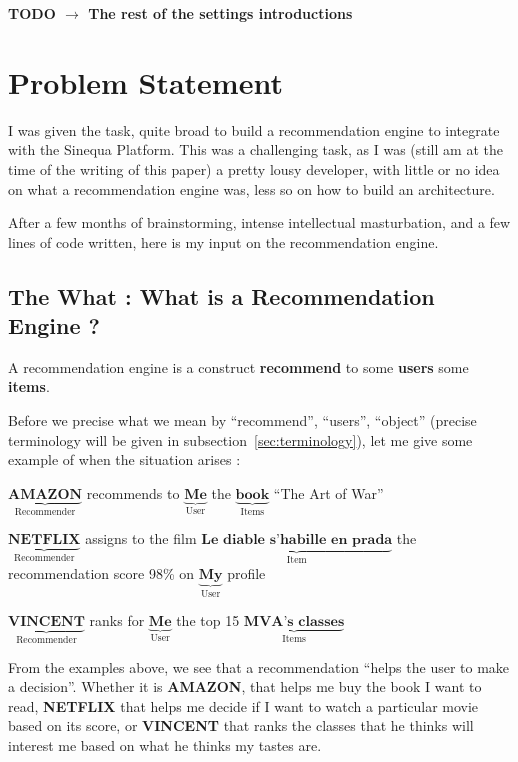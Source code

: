\documentclass{article}
\begin{document}
\textbf{TODO $\rightarrow$ The rest of the settings introductions}

\section{Problem Statement}
\label{sec:problem_statement}

I was given the task, quite broad to build a recommendation engine to integrate with the Sinequa Platform. This was a challenging task, as I was (still am at the time of the writing of this paper) a pretty lousy developer, with little or no idea on what a recommendation engine was, less so on how to build an architecture.

After a few months of brainstorming, intense intellectual masturbation, and a few lines of code written, here is my input on the recommendation engine.

\subsection{The What : What is a Recommendation Engine ?}
\label{sec:what}

A recommendation engine is a construct \textbf{recommend} to some \textbf{users} some \textbf{items}.

Before we precise what we mean by ``recommend'', ``users'', ``object'' (precise terminology will be given in subsection~\ref{sec:terminology}), let me give some example of when the situation arises :
\bigskip

$\underbrace{\textbf{AMAZON}}_\text{Recommender}$ recommends to $\underbrace{\textbf{Me}}_\text{User}$ the $\underbrace{\textbf{book}}_\text{Items}$ ``The Art of War''

\bigskip

$\underbrace{\textbf{NETFLIX}}_\text{Recommender}$ assigns to the film $\underbrace{\textbf{Le diable s'habille en prada}}_\text{Item}$ the recommendation score 98\% on $\underbrace{\textbf{My}}_\text{User}$ profile

\medskip

$\underbrace{\textbf{VINCENT}}_\text{Recommender}$ ranks for $\underbrace{\textbf{Me}}_\text{User}$ the top 15  $\underbrace{\textbf{MVA's classes}}_\text{Items}$ 

\newpage

From the examples above, we see that a recommendation ``helps the user to make a decision''.
Whether it is \textbf{AMAZON}, that helps me buy the book I want to read, \textbf{NETFLIX} that helps me decide if I want to watch a particular movie based on its score, or \textbf{VINCENT} that ranks the classes that he thinks will interest me based on what he thinks my tastes are.
\end{document}
